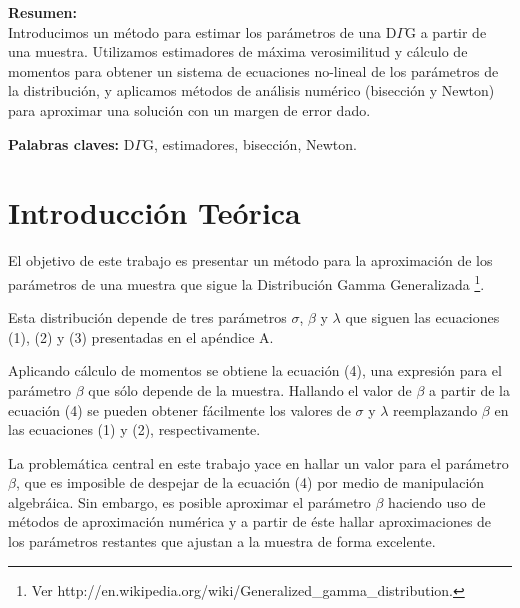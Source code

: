 \documentclass[a4paper,10pt,twoside]{article}
\begin{document}
\textbf{Resumen:} \\
Introducimos un método para estimar los parámetros de una D$\Gamma$G a partir de una muestra.
Utilizamos estimadores de máxima verosimilitud y cálculo de momentos para obtener un sistema
de ecuaciones no-lineal de los parámetros de la distribución, y aplicamos métodos de análisis
numérico (bisección y Newton) para aproximar una solución con un margen de error dado.

\textbf{Palabras claves:} D$\Gamma$G, estimadores, bisección, Newton.

\vspace{6cm}

\newpage




\tableofcontents

\newpage




\section{Introducción Teórica}

El objetivo de este trabajo es presentar un método para la aproximación de los
parámetros de una muestra que sigue la Distribución Gamma Generalizada
\footnote{Ver http://en.wikipedia.org/wiki/Generalized\_gamma\_distribution.}.

Esta distribución depende de tres parámetros $\sigma$, $\beta$ y $\lambda$ que siguen
las ecuaciones (1), (2) y (3) presentadas en el apéndice A.

Aplicando cálculo de momentos se obtiene la ecuación (4), una expresión para
el parámetro $\beta$ que sólo depende de la muestra. Hallando el valor de $\beta$
a partir de la ecuación (4) se pueden obtener fácilmente los valores de $\sigma$
y $\lambda$ reemplazando $\beta$ en las ecuaciones (1) y (2), respectivamente.

La problemática central en este trabajo yace en hallar un valor para el
parámetro $\beta$, que es imposible de despejar de la ecuación (4) por medio de
manipulación algebráica. Sin embargo, es posible aproximar el parámetro $\beta$
haciendo uso de métodos de aproximación numérica y a partir de éste hallar
aproximaciones de los parámetros restantes que ajustan a la muestra de forma
excelente.
\end{document}
